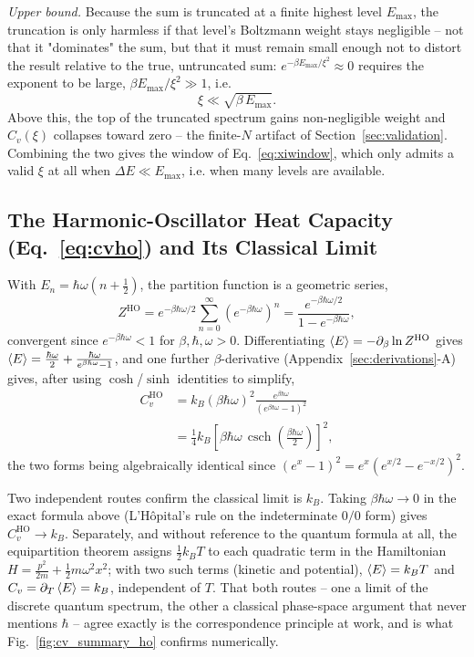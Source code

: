 \documentclass[10pt,conference]{IEEEtran}
\begin{document}
\emph{Upper bound.} Because the sum is truncated at a finite highest level $E_{\max}$, the truncation is only harmless if that level's Boltzmann weight stays negligible -- not that it "dominates" the sum, but that it must remain small enough not to distort the result relative to the true, untruncated sum: $e^{-\beta E_{\max}/\xi^2}\approx0$ requires the exponent to be large, $\beta E_{\max}/\xi^2\gg1$, i.e.
\begin{equation}
\xi \ll \sqrt{\beta\,E_{\max}}.
\end{equation}
Above this, the top of the truncated spectrum gains non-negligible weight and $C_v(\xi)$ collapses toward zero -- the finite-$N$ artifact of Section~\ref{sec:validation}. Combining the two gives the window of Eq.~\eqref{eq:xiwindow}, which only admits a valid $\xi$ at all when $\Delta E\ll E_{\max}$, i.e. when many levels are available.

\subsection{The Harmonic-Oscillator Heat Capacity (Eq.~\ref{eq:cvho}) and Its Classical Limit}
With $E_n=\hbar\omega(n+\tfrac12)$, the partition function is a geometric series,
\begin{equation}
Z^{\text{HO}} = e^{-\beta\hbar\omega/2}\sum_{n=0}^{\infty}\left(e^{-\beta\hbar\omega}\right)^n = \frac{e^{-\beta\hbar\omega/2}}{1-e^{-\beta\hbar\omega}},
\end{equation}
convergent since $e^{-\beta\hbar\omega}<1$ for $\beta,\hbar,\omega>0$. Differentiating $\expval{E}=-\partial_\beta\ln Z^{\text{HO}}$ gives $\expval{E}=\tfrac{\hbar\omega}{2}+\tfrac{\hbar\omega}{e^{\beta\hbar\omega}-1}$, and one further $\beta$-derivative (Appendix~\ref{sec:derivations}-A) gives, after using $\cosh$/$\sinh$ identities to simplify,
\begin{equation}
\begin{aligned}
C_v^{\text{HO}} &= k_B(\beta\hbar\omega)^2\frac{e^{\beta\hbar\omega}}{\left(e^{\beta\hbar\omega}-1\right)^2}\\
&= \frac14 k_B\left[\beta\hbar\omega\,\operatorname{csch}\!\left(\frac{\beta\hbar\omega}{2}\right)\right]^2,
\end{aligned}
\end{equation}
the two forms being algebraically identical since $\left(e^{x}-1\right)^2=e^{x}\left(e^{x/2}-e^{-x/2}\right)^2$.

Two independent routes confirm the classical limit is $k_B$. Taking $\beta\hbar\omega\to0$ in the exact formula above (L'H\^opital's rule on the indeterminate $0/0$ form) gives $C_v^{\text{HO}}\to k_B$. Separately, and without reference to the quantum formula at all, the equipartition theorem assigns $\tfrac12 k_BT$ to each quadratic term in the Hamiltonian $H=\tfrac{p^2}{2m}+\tfrac12 m\omega^2x^2$; with two such terms (kinetic and potential), $\expval{E}=k_BT$ and $C_v=\partial_T\expval{E}=k_B$, independent of $T$. That both routes -- one a limit of the discrete quantum spectrum, the other a classical phase-space argument that never mentions $\hbar$ -- agree exactly is the correspondence principle at work, and is what Fig.~\ref{fig:cv_summary_ho} confirms numerically.
\end{document}
